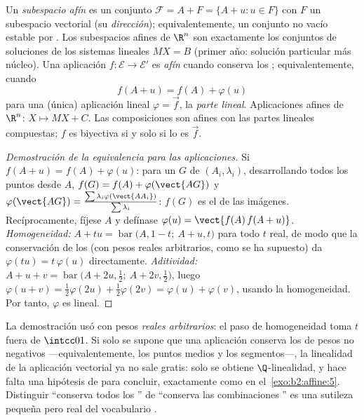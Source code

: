 \begin{definition}\label{def:b2:affine:subspace}
Un \emph{subespacio afín} es un conjunto $\mathcal{F} = A + F = \{A
+ u : u \in F\}$ con $F$ un subespacio vectorial (su
\emph{dirección}); equivalentemente, un conjunto no vacío estable
por . Los subespacios afines de $\R^n$ son exactamente
los conjuntos de soluciones de los sistemas lineales $MX = B$
(primer año: solución particular más núcleo). Una aplicación $f
\colon \mathcal{E} \to \mathcal{E}'$ es \emph{afín} cuando conserva los ; equivalentemente, cuando
\[
f(A + u) = f(A) + \varphi(u)
\]
para una (única) aplicación lineal $\varphi = \vec f$, la
\emph{parte lineal}. Aplicaciones afines de $\R^n$: $X \mapsto MX +
C$. Las composiciones son afines con las partes lineales
compuestas; $f$ es biyectiva si y solo si lo es $\vec f$.
\end{definition}

\begin{proof}[Demostración de la equivalencia para las aplicaciones]
Si $f(A + u) = f(A) + \varphi(u)$: para un  $G$ de $(A_i,
\lambda_i)$, desarrollando todos los puntos desde $A$, $f(G) = f(A)
+ \varphi(\vect{AG})$ y $\varphi(\vect{AG}) =
\frac{\sum\lambda_i\varphi(\vect{AA_i})}{\sum\lambda_i}$: $f(G)$ es
el  de las imágenes. Recíprocamente, fíjese $A$ y
defínase $\varphi(u) = \vect{f(A)\,f(A + u)}$. \emph{Homogeneidad:}
$A + tu = \operatorname{bar}\bigl(A, 1-t;\ A + u, t\bigr)$ para todo
$t$ real, de modo que la conservación de los  (con pesos
reales arbitrarios, como se ha supuesto) da $\varphi(tu) =
t\,\varphi(u)$ directamente. \emph{Aditividad:} $A + u + v =
\operatorname{bar}\bigl(A + 2u, \tfrac12;\ A + 2v, \tfrac12\bigr)$,
luego $\varphi(u + v) = \tfrac12\varphi(2u) + \tfrac12\varphi(2v) =
\varphi(u) + \varphi(v)$, usando la homogeneidad. Por tanto,
$\varphi$ es lineal.
\end{proof}

\begin{remark}
La demostración usó  con pesos \emph{reales
arbitrarios}: el paso de homogeneidad toma $t$ fuera de
$\intcc01$. Si solo se supone que una aplicación conserva los
 de pesos no negativos ---equivalentemente, los puntos
medios y los segmentos---, la linealidad de la aplicación vectorial
ya no sale gratis: solo se obtiene $\Q$-linealidad, y hace falta una
hipótesis de  para concluir, exactamente como en el~\cref{exo:b2:affine:5}. Distinguir ``conserva todos los
'' de ``conserva las combinaciones '' es una
sutileza pequeña pero real del vocabulario .
\end{remark}

